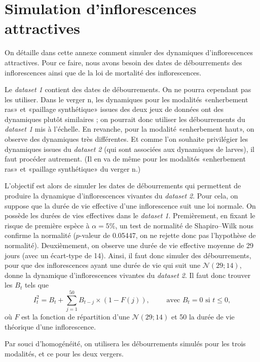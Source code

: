 \chapter{Simulation d'inflorescences attractives} 
\label{chap:deb}

On détaille dans cette annexe comment simuler des dynamiques d'inflorescences attractives.
Pour ce faire, nous avons besoin des dates de débourrements des inflorescences ainsi que de la loi de mortalité des inflorescences.


Le \emph{dataset 1} contient des dates de débourrements. On ne pourra cependant pas les utiliser.
Dans le verger n, les dynamiques pour les modalités «enherbement ras» et «paillage synthétique» issues des deux jeux de données ont des dynamiques plutôt similaires ; on pourrait donc utiliser les débourrements du \emph{dataset 1} mis à l'échelle.
En revanche, pour la modalité «enherbement haut», on observe des dynamiques très différentes. 
Et comme l'on souhaite privilégier les dynamiques issues du \emph{dataset 2} (qui sont associées aux dynamiques de larves), il faut procéder autrement.
(Il en va de même pour les modalités «enherbement ras» et «paillage synthétique» du verger n.)
 
L'objectif est alors de simuler les dates de débourrements qui permettent de produire la dynamique d'inflorescences vivantes du \emph{dataset 2}.
Pour cela, on suppose que la durée de vie effective d'une inflorescence suit une loi normale.
On possède les durées de vies effectives dans le \emph{dataset 1}.
Premièrement, en fixant le risque de première espèce à $\alpha = 5\%$, un test de normalité de Shapiro--Wilk nous confirme la normalité ($p$-valeur de 0.05447, on ne rejette donc pas l'hypothèse de normalité).
Deuxièmement, on observe une durée de vie effective moyenne de 29 jours (avec un écart-type de 14).
Ainsi, il faut donc simuler des débourrements, pour que des inflorescences ayant une durée de vie qui suit une $\mathcal{N}\left( 29; 14 \right)$, donne la dynamique d'inflorescences vivantes du \emph{dataset 2}.
Il faut donc trouver les $B_t$ tels que 
\[
I_{t}^{2} = B_t + \sum_{j = 1}^{50} B_{t - j} \times \left( 1 - F\left( j \right) \right),  \qquad \text{ avec } B_{t} = 0 \text{ si } t \leq 0,
\]
où $F$ est la fonction de répartition d'une $\mathcal{N}\left( 29;14 \right)$ et 50 la durée de vie théorique d'une inflorescence.
 
Par souci d'homogénéité, on utilisera les débourrements simulés pour les trois modalités, et ce pour les deux vergers.




